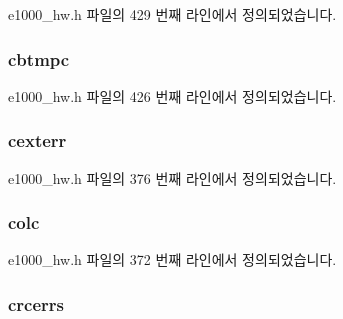 e1000\+\_\+hw.\+h 파일의 429 번째 라인에서 정의되었습니다.

\subsubsection[{\texorpdfstring{cbtmpc}{cbtmpc}}]{ cbtmpc}\hypertarget{structe1000__hw__stats_a0fbc9e6ddc5b2ec1bd9446754393642b}{}\label{structe1000__hw__stats_a0fbc9e6ddc5b2ec1bd9446754393642b}


e1000\+\_\+hw.\+h 파일의 426 번째 라인에서 정의되었습니다.

\subsubsection[{\texorpdfstring{cexterr}{cexterr}}]{ cexterr}\hypertarget{structe1000__hw__stats_ab82d9fff3dc76ed550be6bb7ea423d7a}{}\label{structe1000__hw__stats_ab82d9fff3dc76ed550be6bb7ea423d7a}


e1000\+\_\+hw.\+h 파일의 376 번째 라인에서 정의되었습니다.

\subsubsection[{\texorpdfstring{colc}{colc}}]{ colc}\hypertarget{structe1000__hw__stats_aa2c07cd48b8cc63cf5751a8114e64c89}{}\label{structe1000__hw__stats_aa2c07cd48b8cc63cf5751a8114e64c89}


e1000\+\_\+hw.\+h 파일의 372 번째 라인에서 정의되었습니다.

\subsubsection[{\texorpdfstring{crcerrs}{crcerrs}}]{ crcerrs}\hypertarget{structe1000__hw__stats_aa49d7222d0aba7b0c611ed7afcd0b2bc}{}\label{structe1000__hw__stats_aa49d7222d0aba7b0c611ed7afcd0b2bc}


